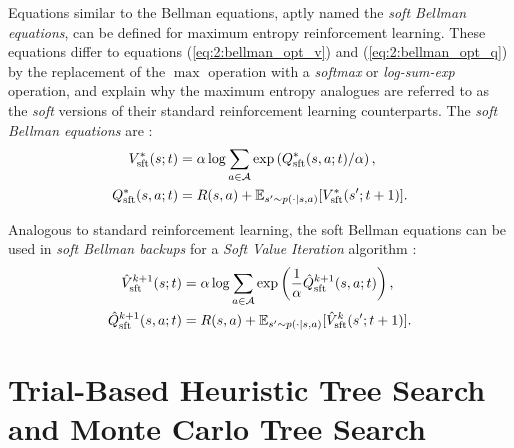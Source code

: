         Equations similar to the Bellman equations, aptly named the \textit{soft Bellman equations}, can be defined for maximum entropy reinforcement learning. These equations differ to equations (\ref{eq:2:bellman_opt_v}) and (\ref{eq:2:bellman_opt_q}) by the replacement of the $\max$ operation with a \textit{softmax} or \textit{log-sum-exp} operation, and explain why the maximum entropy analogues are referred to as the \textit{soft} versions of their standard reinforcement learning counterparts. The \textit{soft Bellman equations} are \cite{deep_energy_policies}:
        \begin{align}
            V_{{\textnormal{sft}}}^*(s;t) &= \alpha \log \sum_{a\in\mathcal{A}} \exp\left( Q_{{\textnormal{sft}}}^*(s,a;t) / \alpha \right), \label{eq:2:sft_bellman_opt_v} \\
            Q_{{\textnormal{sft}}}^*(s,a;t) &= R(s,a) + \mathbb{E}_{s'\sim p(\cdot|s,a)} [V_{{\textnormal{sft}}}^*(s';t+1)]. \label{eq:2:sft_bellman_opt_q}
        \end{align} 

        Analogous to standard reinforcement learning, the soft Bellman equations can be used in \textit{soft Bellman backups} for a \textit{Soft Value Iteration} algorithm \cite{deep_energy_policies}:
        \begin{align}
            \hat{V}_{{\textnormal{sft}}}^{k+1}(s;t) &= \alpha \log \sum_{a\in\mathcal{A}} \exp\left( \frac{1}{\alpha} \hat{Q}_{{\textnormal{sft}}}^{k+1}(s,a;t) \right), \label{eq:2:soft_value_iter_v_backup} \\
            \hat{Q}_{{\textnormal{sft}}}^{k+1}(s,a;t) &= R(s,a) + \mathbb{E}_{s'\sim p(\cdot|s,a)} [\hat{V}_{{\textnormal{sft}}}^k(s';t+1)]. \label{eq:2:soft_value_iter_q_backup}
        \end{align}

        














\section{Trial-Based Heuristic Tree Search and Monte Carlo Tree Search}
\label{sec:2-4-thts}


